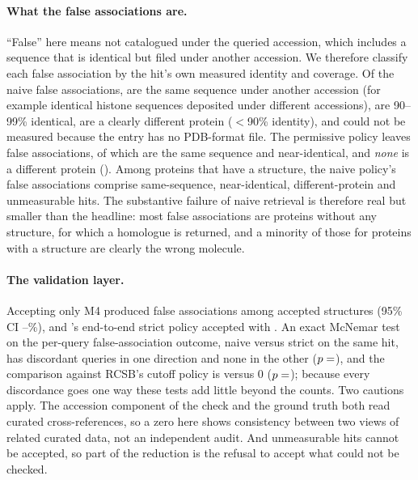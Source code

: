 \paragraph{What the false associations are.} ``False'' here means not catalogued
under the queried accession, which includes a sequence that is identical but
filed under another accession. We therefore classify each false association by
the hit's own measured identity and coverage. Of the  naive false
associations,  are the same sequence under another accession (for
example identical histone sequences deposited under different accessions),
 are 90--99\% identical,  are a clearly different
protein ($<$90\% identity), and  could not be measured because the
entry has no PDB-format file. The permissive policy leaves  false
associations, of which  are the same sequence and
 near-identical, and \emph{none} is a different protein
(). Among proteins that have a structure, the naive policy's
 false associations comprise  same-sequence,
 near-identical,  different-protein and
 unmeasurable hits. The substantive failure of naive retrieval
is therefore real but smaller than the headline: most false associations are
proteins without any structure, for which a homologue is returned, and a minority
of those for proteins with a structure are clearly the wrong molecule.

\paragraph{The validation layer.} Accepting only M4 produced 
false associations among  accepted structures (95\% CI
--\%), and \bsi's end-to-end strict policy
accepted  with . An exact McNemar test on the
per-query false-association outcome, naive versus strict on the same hit, has
 discordant queries in one direction and none in the other
($p = \N{p-n1-s1}$), and the comparison against RCSB's cutoff policy is
 versus 0 ($p = \N{p-n2-s2}$); because every discordance goes one way
these tests add little beyond the counts. Two cautions apply. The accession
component of the check and the ground truth both read curated cross-references,
so a zero here shows consistency between two views of related curated data, not
an independent audit. And unmeasurable hits cannot be accepted, so part of the
reduction is the refusal to accept what could not be checked.

